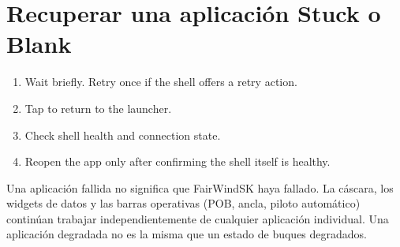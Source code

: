 \section{Recuperar una aplicación Stuck o Blank}

\begin{enumerate}
  \item Wait briefly. Retry once if the shell offers a retry action.
  \item Tap  to return to the launcher.
  \item Check shell health and connection state.
  \item Reopen the app only after confirming the shell itself is healthy.
\end{enumerate}

\begin{tipbox}
Una aplicación fallida no significa que FairWindSK haya fallado.
La cáscara, los widgets de datos y las barras operativas (POB, ancla, piloto automático) continúan
trabajar independientemente de cualquier aplicación individual.
Una aplicación degradada no es la misma que un estado de buques degradados.
\end{tipbox}
